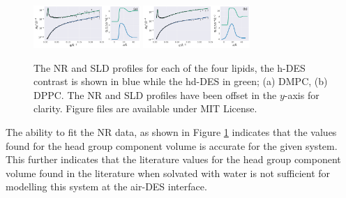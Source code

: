 \documentclass[twoside,twocolumn,9pt]{article}
\begin{document}
\begin{figure}
	\centering
	\includegraphics[width=0.36\textwidth]{figures/nDMPC_all_data}
	\includegraphics[width=0.36\textwidth]{figures/nDPPC_all_data}
	\caption{The NR and SLD profiles for each of the four lipids, the h-DES contrast is shown in blue while the hd-DES in green; (a) DMPC, (b) DPPC. The NR and SLD profiles have been offset in the $y$-axis for clarity. Figure files are available under MIT License.\cite{mccluskey_2018}}
	\label{fig:neutron}
\end{figure}

The ability to fit the NR data, as shown in Figure \ref{fig:neutron} indicates that the values found for the head group component volume is accurate for the given system. This further indicates that the literature values for the head group component volume found in the literature when solvated with water is not sufficient for modelling this system at the air-DES interface. 
\end{document}
